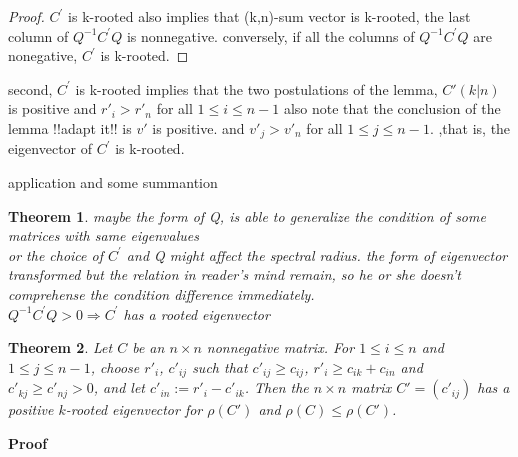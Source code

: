 \documentclass{beamer}
\theoremstyle{plain}
\newtheorem{thm}{Theorem}[section]
\theoremstyle{definition}
\begin{document}
\begin{frame}
    \begin{proof}
        $C^{ '}$ is k-rooted also implies that (k,n)-sum vector is k-rooted,
	the last column of $Q^{-1}C^{ '}Q$ is nonnegative.
	conversely, if all the columns of $Q^{-1}C^{ '}Q$ are nonegative, $C^{ '}$ is k-rooted.
    \end{proof}
	second, $C^{ '}$ is k-rooted implies that the two postulations of the lemma, $C' (k|n)$ is positive and  $r'_i> r'_n$ for all $1\leq i\leq n-1$ also note that the conclusion of the lemma !!adapt it!! is $v'$ is positive. and $v'_j>v'_n$ for all $1\leq j\leq n-1.$ ,that is, the eigenvector of $C^{ '}$ is  k-rooted.

\end{frame}

\begin{frame}{application and some summantion}
    \begin{thm}
        maybe the form of Q, is able to generalize the condition of some matrices with same eigenvalues\\
        or the choice of $C^{ '}$ and Q might affect the spectral radius.
        the form of eigenvector transformed but the relation in reader's mind remain, so he or she doesn't comprehense the condition difference immediately. \\
	$Q^{-1}C^{ '}Q > 0 \Rightarrow C^{ '}$ has a rooted eigenvector

    \end{thm}
\end{frame}


\begin{frame}

\begin{thm}
Let $C$ be an $n\times n$ nonnegative matrix. For $1\leq i \leq n$ and $1\leq j\leq n-1$, choose $r'_i$, $c'_{ij}$
such that $c'_{ij}\geq c_{ij}$, $r'_i\geq c_{ik}+c_{in}$ and $c'_{kj}\geq c'_{nj}>0$, and 
let $c'_{in}:=r'_i-c'_{ik}$. Then the $n\times n$ matrix $C'=(c'_{ij})$ has a positive $k$-rooted eigenvector for $\rho(C')$ and $\rho(C)\leq \rho(C')$. 
\end{thm}

\end{frame}

\begin{frame}{\bf Proof}



\end{frame}
\end{document}
